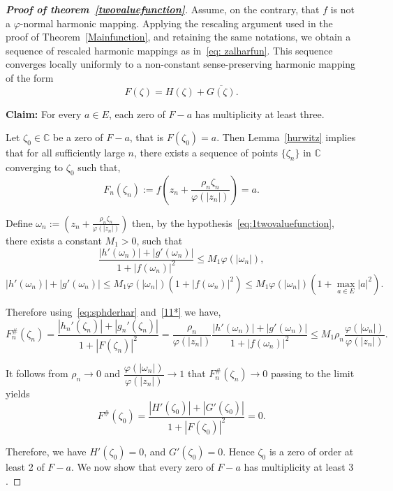 \documentclass[10pt,a4paper]{amsart}
\numberwithin{equation}{section}
\begin{document}
\begin{proof}[\bf{Proof of theorem~\ref{twovaluefunction}}]
Assume, on the contrary, that $f$ is not a
  $\varphi$-normal harmonic mapping. Applying the rescaling
argument used in the proof of Theorem~\ref{Mainfunction}, 
and retaining the same notations, we obtain
  a sequence of rescaled harmonic mappings as in~\eqref{eq: zalharfun}.
This sequence converges locally uniformly to a non-constant sense-preserving 
harmonic mapping of the form
  \[
  F(\zeta)=H(\zeta)+\overline{G(\zeta)}.
  \]

\noindent \textbf{Claim:} For every $a\in E$, each
 zero of $F-a$ has multiplicity at least three.
\smallskip

Let $\zeta_0 \in \mathbb{C}$ be a zero 
of $F-a$, that is $F(\zeta_0)=a$.
Then Lemma~\ref{hurwitz} implies that for all sufficiently large 
$n$, there exists a sequence of points $\{\zeta_n\}$
 in $\mathbb{C}$ converging to $\zeta_0$ such that,
\[
F_n(\zeta_n):=f\!\left(z_n+\frac{\rho_n\zeta_n}
{\varphi(|z_n|)}\right)=a.
\]

Define $\omega_n:=\!\left(z_n+\frac{\rho_n\zeta_n}
{\varphi(|z_n|)}\right)$
then, by the hypothesis~\eqref{eq:1twovaluefunction},
 there exists a constant 
$M_1>0$, such that
\begin{equation}\label{11*}
  \frac{|h'(\omega_n)|+|g'(\omega_n)|}
{1+|f(\omega_n)|^2}\leq M_1\varphi(|\omega_n|),
\end{equation}
\begin{equation}\label{*1*}
{|h'(\omega_n)|+|g'(\omega_n)|}
\leq M_1\varphi(|\omega_n|)({1+|f(\omega_n)|^2})
\leq M_1\varphi(|\omega_n|)({1+\max_{a\in E}|a|^2}).
\end{equation}

Therefore using~\eqref{eq:sphderhar} and~\eqref{11*} we have,
\[
F_n^\#(\zeta_n)=\frac{|h_n'(\zeta_n)|+|g_n'(\zeta_n)|}
{1+|F(\zeta_n)|^2}=\frac{\rho_n}{\varphi(|z_n|)}
\frac{|h'(\omega_n)|+|g'(\omega_n)|}{1+|f(\omega_n)|^2
}\leq M_1\rho_n \frac{\varphi(|\omega_n|)}{\varphi(|z_n|)}.
\]

It follows from $\rho_n \to 0$ and 
$\dfrac{\varphi(|\omega_n|)}{\varphi(|z_n|)} \longrightarrow 1$
that $F_n^{\#}(\zeta_n)\rightarrow 0 $ passing to the limit yields
\begin{equation}\label{eq: H'andG'=0}
  F^{\#}(\zeta_0)=\frac{|H'(\zeta_0)|+|G'(\zeta_0)|}{1+|F(\zeta_0)|^2}=0.
\end{equation}

Therefore, we have $H'(\zeta_0)=0$, and $G'(\zeta_0)=0$. 
Hence $\zeta_0$ is a zero of order at least
 2 of $F-a$. We now show that every zero of $F-a$ 
 has multiplicity at least $3$.
\smallskip


\end{proof}
\end{document}
